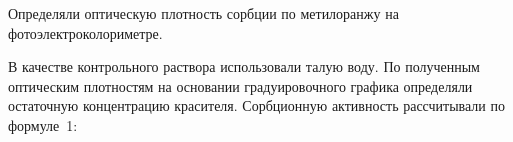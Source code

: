 
Определяли оптическую плотность сорбции по метилоранжу на
фотоэлектроколориметре.

В качестве контрольного раствора использовали талую воду. По полученным
оптическим плотностям на основании градуировочного графика определяли
остаточную концентрацию красителя. Сорбционную активность рассчитывали
по формуле~1:

